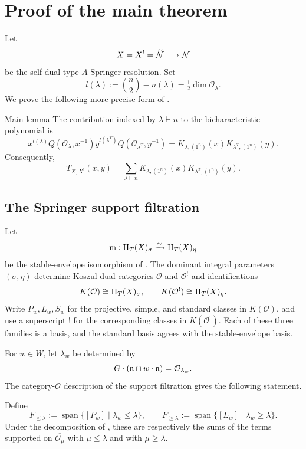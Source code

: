 \section{Proof of the main theorem}
\label{chapter_main_thm}

Let
\[
  X=X^!=\widetilde{\mathcal{N}}\longrightarrow\mathcal{N}
\]
be the self-dual type $A$ Springer resolution. Set
\[
  l(\lambda):=\binom n2-n(\lambda)
  =\tfrac12\dim\mathcal O_\lambda.
\]
We prove the following more precise form of
.

\begin{lemma}{Main lemma}
  The contribution indexed by $\lambda\vdash n$ to the
  bicharacteristic polynomial is
  \[
    x^{l(\lambda)}Q(\mathcal O_\lambda,x^{-1})
    y^{l(\lambda^T)}Q(\mathcal O_{\lambda^T},y^{-1})
    =K_{\lambda,(1^n)}(x)K_{\lambda^T,(1^n)}(y).
  \]
  Consequently,
  \[
    T_{X,X^!}(x,y)
    =\sum_{\lambda\vdash n}
      K_{\lambda,(1^n)}(x)K_{\lambda^T,(1^n)}(y).
  \]
\end{lemma}

\subsection{The Springer support filtration}

Let
\[
  \mathrm{m}:\mathrm{H}_T(X)_\sigma\xrightarrow{\sim}\mathrm{H}_T(X)_\eta
\]
be the stable-envelope isomorphism of . The dominant
integral parameters $(\sigma,\eta)$ determine Koszul-dual categories
$\mathcal O$ and $\mathcal O^!$ and identifications
\[
  K(\mathcal O)\cong\mathrm{H}_T(X)_\sigma,
  \qquad
  K(\mathcal O^!)\cong\mathrm{H}_T(X)_\eta.
\]
Write $P_w,L_w,S_w$ for the projective, simple, and standard classes in
$K(\mathcal O)$, and use a superscript $!$ for the corresponding
classes in $K(\mathcal O^!)$. Each of these three families is a basis,
and the standard basis agrees with the stable-envelope basis.

For $w\in W$, let $\lambda_w$ be determined by
\[
  G\cdot(\mathfrak{n}\cap w\cdot\mathfrak{n})=\mathcal O_{\lambda_w}.
\]
The category-$\mathcal O$ description of the support filtration gives
the following statement.

\begin{proposition}{}
  Define
  \[
    F_{\leq\lambda}
      :=\operatorname{span}\{[P_w]\mid\lambda_w\leq\lambda\},
    \qquad
    F_{\geq\lambda}
      :=\operatorname{span}\{[L_w]\mid\lambda_w\geq\lambda\}.
  \]
  Under the decomposition of , these are
  respectively the sums of the terms supported on
  $\overline{\mathcal O_\mu}$ with $\mu\leq\lambda$ and with
  $\mu\geq\lambda$.
\end{proposition}

